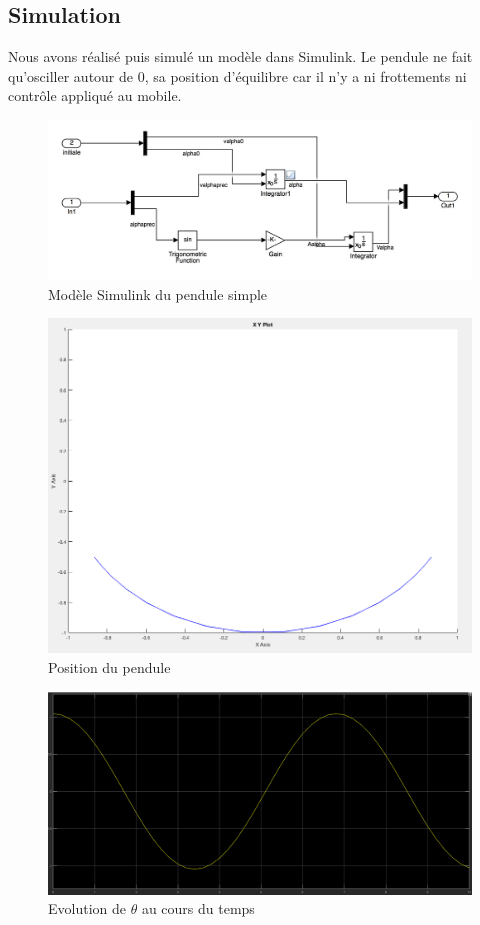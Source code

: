 \documentclass[11pt]{article}
\begin{document}
\subsection{Simulation}
Nous avons réalisé puis simulé un modèle dans Simulink. Le pendule ne fait qu'osciller autour de 0, sa position d'équilibre car il n'y a ni frottements ni contrôle appliqué au mobile.
\begin{figure}[h]
	\includegraphics[scale=0.3]{images/pendule_simple_sys}
	\caption{Modèle Simulink du pendule simple}
	\label{model_pendule_simu}
\end{figure}
\begin{figure}[h!]
	\includegraphics[scale=0.3]{images/pendule_simple_XY}
	\caption{Position du pendule}
	\label{simu_pendule_xy}
\end{figure} 
\begin{figure}[h!]
	\includegraphics[scale=0.3]{images/pendule_simple_graph}
	\caption{Evolution de $\theta$ au cours du temps}
	\label{simu_pendule}
\end{figure}\\
\end{document}
